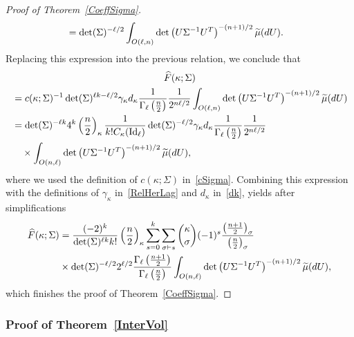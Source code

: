 \documentclass[10pt]{amsart}
\theoremstyle{definition}\newtheorem{defi}[theo]{Definition}\newtheorem{rema}[theo]{Remark}\newtheorem{exam}[theo]{Example}\newtheorem{exem}[theo]{Example}\newtheorem{nota}[theo]{Notation}
\DeclareMathOperator{\Id}{Id}
\let\oldtilde\tilde
\renewcommand*{\tilde}[1]{\mathchoice{\widetilde{#1}}{\widetilde{#1}}{\oldtilde{#1}}{\oldtilde{#1}}}
\begin{document}
\begin{proof}[Proof of Theorem~\ref{CoeffSigma}]
\begin{align*}
&= \det(\Sigma)^{-\ell/2} \int_{O(\ell,n)} \det\left(U\Sigma^{-1}U^T\right)^{-(n+1)/2} \tilde{\mu}(dU).
\end{align*}
Replacing this expression into the previous relation, we conclude that
\begin{multline*}
\widehat{F}(\kappa; \Sigma)\\
\begin{aligned}
&= c(\kappa;\Sigma)^{-1}\det(\Sigma)^{\ell k-\ell/2} \gamma_{\kappa} d_{\kappa} \frac{1}{\Gamma_{\ell}\left(\frac{n}{2}\right)}
\frac{1}{2^{n\ell/2}} \int_{O(\ell,n)} \det\left(U\Sigma^{-1}U^T\right)^{-(n+1)/2} \tilde{\mu}(dU) \\
&= \det(\Sigma)^{-\ell k}4^{k}
\left(\frac{n}{2}\right)_{\kappa} \frac{1}{ k !C_{\kappa}(\Id_{\ell})}
\det(\Sigma)^{-\ell/2} \gamma_{\kappa} d_{\kappa}
\frac{1}{\Gamma_{\ell}\left(\frac{n}{2}\right)}
\frac{1}{2^{n\ell/2}} \\
&\quad \times\int_{O(n,\ell)} \det\left(U\Sigma^{-1}U^T\right)^{-(n+1)/2} \tilde{\mu}(dU),
\end{aligned}
\end{multline*}
where we used the definition of $c(\kappa;\Sigma)$ in~\eqref{cSigma}. Combining this expression with the definitions of $\gamma_{\kappa}$ in~\eqref{RelHerLag} and $d_{\kappa}$ in~\eqref{dk}, yields after simplifications
\begin{align*}
\widehat{F}(\kappa; \Sigma) &= \frac{ (-2)^{k} }{\det(\Sigma)^{\ell k} k!}\left(\frac{n}{2}\right)_{\kappa}
\sum_{s=0}^{k} \sum_{\sigma\vdash s} \binom{\kappa}{\sigma} (-1)^s\frac{\left(\frac{n+1}{2}\right)_{\sigma}}{\left(\frac{n}{2}\right)_{\sigma}} \\
&\times
\det(\Sigma)^{-\ell/2} 2^{\ell/2} \frac{\Gamma_{\ell}\left(\frac{n+1}{2}\right)}{\Gamma_{\ell}\left(\frac{n}{2}\right)} \int_{O(n,\ell)} \det\left(U\Sigma^{-1}U^T\right)^{-(n+1)/2} \tilde{\mu}(dU),
\end{align*}
which finishes the proof of Theorem~\ref{CoeffSigma}.
\end{proof}



\subsubsection*{Proof of Theorem~\ref{InterVol}}
\end{document}
